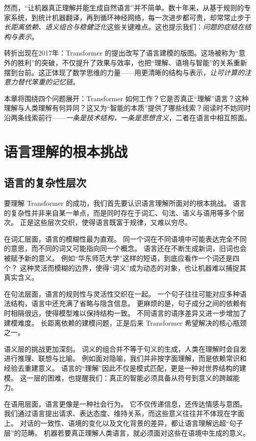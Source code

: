 然而，“让机器真正理解并能生成自然语言”并不简单。数十年来，从基于规则的专家系统，到统计机器翻译，再到循环神经网络，每一次进步都可贵，却常常止步于\emph{长距离依赖、语义组合与稳健泛化}这些关键难点。这也提示我们：\emph{问题的症结在结构与表示}。

转折出现在2017年：Transformer 的提出改写了语言建模的版图。这场被称为“意外的胜利”的突破，不仅提升了效果与效率，也把“理解、语境与智能”的关系重新摆到台前。这正体现了数学思维的力量——用更清晰的结构与表示，\emph{让可计算的注意力替代笨重的记忆链}。

本章将围绕四个问题展开：Transformer 如何工作？它是否真正“理解”语言？这种理解与人类理解有何异同？这又为“智能的本质”提供了哪些线索？阅读时不妨同时沿两条线索前行——\emph{一条是技术结构，一条是思想含义}，二者在语言中相互照面。

\section{语言理解的根本挑战}

\subsection{语言的复杂性层次}

要理解 Transformer 的成功，我们首先要认识语言理解所面对的根本挑战。  
语言的复杂性并非来自某一单点，而是同时存在于词汇、句法、语义与语用等多个层次。  
正是这些层次交织，使得语言既富于规律，又难以穷尽。  

在词汇层面，语言的模糊性最为直观。  
同一个词在不同语境中可能表达完全不同的意思，而不同的词又可能指向同一个概念。  
语言还在不断生成新词，旧词也会被赋予新的意义。  
例如“华东师范大学”这样的短语，到底应看作一个词还是四个？  
这种灵活而模糊的边界，使得“词义”成为动态的对象，也让机器难以捕捉其真实含义。  

在句法层面，语言的规则性与灵活性交织在一起。  
一个句子往往可能对应多种语法结构，语言中还充满了省略与隐含信息。  
更麻烦的是，句子成分之间的依赖有时相隔很远，使得模型难以保持结构一致。  
不同语言的语序差异又进一步增加了建模难度。  
长距离依赖的建模问题，正是后来 Transformer 希望解决的核心瓶颈之一。  

语义层的挑战更加深刻。  
词义的组合并不等于句义的生成，人类在理解时会自发进行推理、联想与比喻。  
例如面对隐喻，我们并非按字面理解，而是依赖常识和经验去重建意义。  
语言的“理解”因此不仅是模式匹配，更是一种对世界结构的建模。  
这一层的困难，也提醒我们：真正的智能必须具备从符号到意义的跨越能力。  

在语用层面，语言更像是一种社会行为。  
它不仅传递信息，还传达情感与意图。  
我们通过语言提出请求、表达态度、维持关系，而这些意义往往并不体现在字面上。  
对话的一致性、语境的变化以及文化背景的差异，都让语言理解远超“句子层”的范畴。  
机器若要真正理解人类语言，就必须面对这些在语境中生成的意义。  

